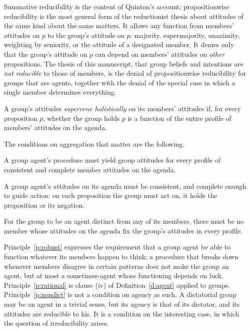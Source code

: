 \documentclass{situationist-preprint}
\begin{document}
Summative reducibility is the content of Quinton's account; propositionwise reducibility is the most general form of the reductionist thesis about attitudes of the same kind about the same matters. It allows any function from members' attitudes on $p$ to the group's attitude on $p$: majority, supermajority, unanimity, weighting by seniority, or the attitude of a designated member. It denies only that the group's attitude on $p$ can depend on members' attitudes on \emph{other} propositions. The thesis of this manuscript, that group beliefs and intentions are \emph{not reducible} to those of members, is the denial of propositionwise reducibility for groups that are agents, together with the denial of the special case in which a single member determines everything.

\begin{definition}\label{d:holistic}
A group's attitudes \emph{supervene holistically} on its members' attitudes if, for every proposition $p$, whether the group holds $p$ is a function of the entire profile of members' attitudes on the agenda.
\end{definition}

The conditions on aggregation that matter are the following.

\begin{principle}[Robustness]\label{p:robust}
A group agent's procedure must yield group attitudes for every profile of consistent and complete member attitudes on the agenda.
\end{principle}

\begin{principle}\label{p:rational}
A group agent's attitudes on its agenda must be consistent, and complete enough to guide action: on each proposition the group must act on, it holds the proposition or its negation.
\end{principle}

\begin{principle}\label{p:nondict}
For the group to be an agent distinct from any of its members, there must be no member whose attitudes on the agenda fix the group's attitudes in every profile.
\end{principle}

Principle~\ref{p:robust} expresses the requirement that a group agent be able to function whatever its members happen to think; a procedure that breaks down whenever members disagree in certain patterns does not make the group an agent, but at most a sometimes-agent whose functioning depends on luck. Principle~\ref{p:rational} is clause (iv) of Definition~\ref{d:agent} applied to groups. Principle~\ref{p:nondict} is not a condition on agency as such. A dictatorial group may be an agent in a trivial sense, but its agency is that of its dictator, and its attitudes are reducible to his. It is a condition on the interesting case, in which the question of irreducibility arises.
\end{document}

